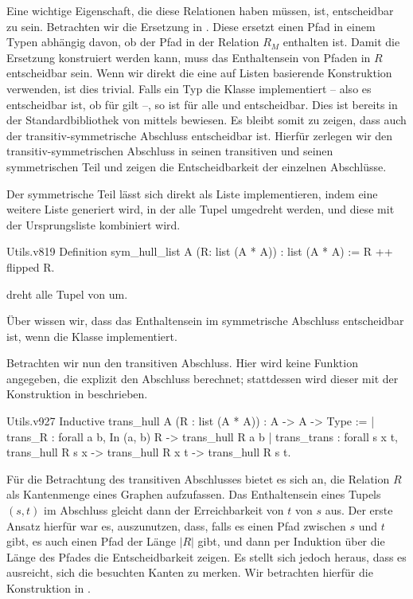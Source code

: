 Eine wichtige Eigenschaft, die diese Relationen haben müssen, ist, entscheidbar zu sein. Betrachten wir die Ersetzung in . Diese ersetzt einen Pfad in einem Typen abhängig davon, ob der Pfad in der Relation $R_M$ enthalten ist. Damit die Ersetzung konstruiert werden kann, muss das Enthaltensein von Pfaden in $R$ entscheidbar sein. Wenn wir direkt die eine auf Listen basierende Konstruktion verwenden, ist dies trivial. Falls ein Typ  die Klasse  implementiert -- also es entscheidbar ist, ob für  gilt  --, so ist  für alle  und  entscheidbar. Dies ist bereits in der Standardbibliothek von \coq{} mittels  bewiesen. Es bleibt somit zu zeigen, dass auch der transitiv-symmetrische Abschluss entscheidbar ist. Hierfür zerlegen wir den transitiv-symmetrischen Abschluss in seinen transitiven und seinen symmetrischen Teil und zeigen die Entscheidbarkeit der einzelnen Abschlüsse. 

Der symmetrische Teil lässt sich direkt als Liste implementieren, indem eine weitere Liste generiert wird, in der alle Tupel umgedreht werden, und diese mit der Ursprungsliste kombiniert wird.
\begin{code}{Utils.v}{}{819}
Definition sym_hull_list {A} (R: list (A * A)) : list (A * A) :=
    R ++ flipped R.
\end{code}
\begin{remark}
     dreht alle Tupel von  um.
\end{remark}

Über  wissen wir, dass das Enthaltensein im symmetrische Abschluss entscheidbar ist, wenn  die Klasse  implementiert.

Betrachten wir nun den transitiven Abschluss. Hier wird keine Funktion angegeben, die explizit den Abschluss berechnet; stattdessen wird dieser mit der Konstruktion in  beschrieben.
\begin{code}{Utils.v}{}{927}
Inductive trans_hull {A} (R : list (A * A)) : A -> A -> Type :=
  | trans_R : forall a b, In (a, b) R -> trans_hull R a b
  | trans_trans : forall s x t, trans_hull R s x -> trans_hull R x t -> 
      trans_hull R s t.
\end{code}

Für die Betrachtung des transitiven Abschlusses bietet es sich an, die Relation $R$ als Kantenmenge eines Graphen aufzufassen. Das Enthaltensein eines Tupels $(s,t)$ im Abschluss gleicht dann der Erreichbarkeit von $t$ von $s$ aus.
Der erste Ansatz hierfür war es, auszunutzen, dass, falls es einen Pfad zwischen $s$ und $t$ gibt, es auch einen Pfad der Länge $|R|$ gibt, und dann per Induktion über die Länge des Pfades die Entscheidbarkeit zeigen. Es stellt sich jedoch heraus, dass es ausreicht, sich die besuchten Kanten zu merken. Wir betrachten hierfür die Konstruktion in .

